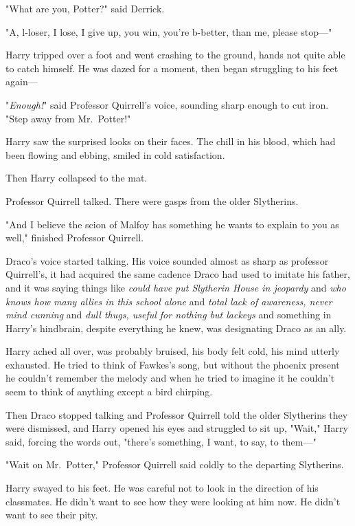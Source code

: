 "What are you, Potter?" said Derrick.

"A, l-loser, I lose, I give up, you win, you're b-better, than me, please 
stop---"

Harry tripped over a foot and went crashing to the ground, hands not quite able 
to catch himself. He was dazed for a moment, then began struggling to his feet 
again---

"\emph{Enough!}" said Professor Quirrell's voice, sounding sharp enough to cut 
iron. "Step away from Mr.~Potter!"

Harry saw the surprised looks on their faces. The chill in his blood, which had 
been flowing and ebbing, smiled in cold satisfaction.

Then Harry collapsed to the mat.

Professor Quirrell talked. There were gasps from the older Slytherins.

"And I believe the scion of Malfoy has something he wants to explain to you as 
well," finished Professor Quirrell.

Draco's voice started talking. His voice sounded almost as sharp as professor 
Quirrell's, it had acquired the same cadence Draco had used to imitate his 
father, and it was saying things like \emph{could have put Slytherin House in 
jeopardy} and \emph{who knows how many allies in this school alone} and 
\emph{total lack of awareness, never mind cunning} and \emph{dull thugs, useful 
for nothing but lackeys} and something in Harry's hindbrain, despite everything 
he knew, was designating Draco as an ally.

Harry ached all over, was probably bruised, his body felt cold, his mind 
utterly exhausted. He tried to think of Fawkes's song, but without the phoenix 
present he couldn't remember the melody and when he tried to imagine it he 
couldn't seem to think of anything except a bird chirping.

Then Draco stopped talking and Professor Quirrell told the older Slytherins 
they were dismissed, and Harry opened his eyes and struggled to sit up, "Wait," 
Harry said, forcing the words out, "there's something, I want, to say, to 
them---"

"Wait on Mr.~Potter," Professor Quirrell said coldly to the departing 
Slytherins.

Harry swayed to his feet. He was careful not to look in the direction of his 
classmates. He didn't want to see how they were looking at him now. He didn't 
want to see their pity.

